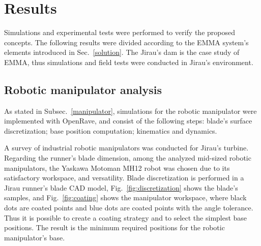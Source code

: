 \section{Results}



Simulations and experimental tests were performed to verify the proposed
concepts. The following results were divided according to the EMMA system's
elements introduced in Sec.~\ref{solution}. The Jirau's dam is the case study of
EMMA, thus simulations and field tests were conducted in Jirau's environment.


\subsection{Robotic manipulator analysis}\label{sec::man_analysis}

As stated in Subsec.~\ref{manipulator}, simulations for the robotic
manipulator were implemented with OpenRave, and consist of the following steps:
blade's surface discretization; base position computation; kinematics
and dynamics.

A survey of industrial robotic manipulators was conducted for Jirau's turbine.
Regarding the runner's blade dimension, among the analyzed mid-sized robotic
manipulators, the Yaskawa Motoman MH12 robot was chosen due to its satisfactory
workspace, and versatility. Blade discretization is performed in a Jirau
runner's blade CAD model, Fig.~\ref{fig:discretization} shows the blade's
samples, and Fig.~\ref{fig:coating} shows the manipulator workspace, where
black dots are coated points and blue dots are coated points with the angle
tolerance. Thus it is possible to create a coating strategy and to select the
simplest base positions. The result is the minimum required positions for the
robotic manipulator's base.

